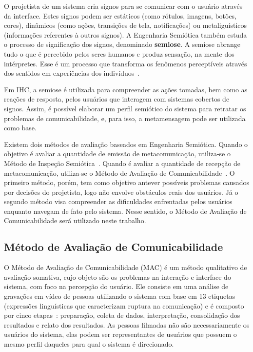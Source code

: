 \indent O projetista de um sistema cria signos para se comunicar com o usuário através da interface. Estes signos podem ser estáticos (como rótulos, imagens, botões, cores), dinâmicos (como ações, transições de tela, notificações) ou metaliguísticos (informações referentes à outros signos). A Engenharia Semiótica também estuda o processo de significação dos signos, denominado \textbf{semiose}. A semiose abrange tudo o que é percebido pelos seres humanos e produz sensação, na mente dos intérpretes. Esse é um processo que transforma os fenômenos perceptíveis através dos sentidos em experiências dos indivíduos~\cite{semiose01}. 

\indent Em IHC, a semiose é utilizada para compreender as ações tomadas, bem como as reações de resposta, pelos usuários que interagem com sistemas cobertos de signos. Assim, é possível elaborar um perfil semiótico do sistema para retratar os problemas de comunicabilidade, e, para isso, a metamensagem pode ser utilizada como base.

\indent Existem dois métodos de avaliação baseados em Engenharia Semiótica. Quando o objetivo é avaliar a quantidade de emissão de metacomunicação, utiliza-se o Método de Inspeção Semiótica~\cite{IHCbook}. Quando é avaliar a quantidade de recepção de metacomunicação, utiliza-se o Método de Avaliação de Comunicabilidade~\cite{IHCbook}. O primeiro método, porém, tem como objetivo antever possíveis problemas causados por decisões do projetista, logo não envolve obstáculos reais dos usuários. Já o segundo método visa compreender as dificuldades enfrentadas pelos usuários enquanto navegam de fato pelo sistema. Nesse sentido, o Método de Avaliação de Comunicabilidade será utilizado neste trabalho.


\subsection{Método de Avaliação de Comunicabilidade} \label{MAC}

\indent O Método de Avaliação de Comunicabilidade (MAC) é um método qualitativo de avaliação somativa, cujo objeto são os problemas na interação e interface do sistema, com foco na percepção do usuário. Ele consiste em uma análise de gravações em vídeo de pessoas utilizando o sistema com base em 13 etiquetas (expressões linguísticas que caracterizam ruptura na comunicação) e é composto por cinco etapas~\cite{IHCbook}: preparação, coleta de dados, interpretação, consolidação dos resultados e relato dos resultados. As pessoas filmadas não são necessariamente os usuários do sistema, elas podem ser representantes de usuários que possuem o mesmo perfil daqueles para qual o sistema é direcionado. 

